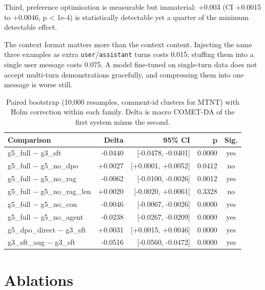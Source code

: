 \documentclass[a4paper,12pt,oneside]{article}
\begin{document}
Third, preference optimisation is measurable but immaterial: +0.003 (CI +0.0015 to +0.0046,
p < 1e-4) is statistically detectable yet a quarter of the minimum detectable effect.

The context format matters more than the context content. Injecting the same three examples as
extra \texttt{user}/\texttt{assistant} turns costs 0.015; stuffing them into a single user message costs 0.075.
A model fine-tuned on single-turn data does not accept multi-turn demonstrations gracefully, and
compressing them into one message is worse still.

\begin{table}[htbp]
\centering
\small

\begin{tabular}{lrrrc}
\toprule
\textbf{Comparison} & \textbf{Delta} & \textbf{95\% CI} & \textbf{p} & \textbf{Sig.} \\
\midrule
g5\_full $-$ g3\_sft & -0.0440 & [-0.0478, -0.0401] & 0.0000 & yes \\
g5\_full $-$ g5\_no\_dpo & +0.0027 & [+0.0001, +0.0052] & 0.0412 & no \\
g5\_full $-$ g5\_no\_rag & -0.0062 & [-0.0100, -0.0026] & 0.0012 & yes \\
g5\_full $-$ g5\_no\_rag\_len & +0.0020 & [-0.0020, +0.0061] & 0.3328 & no \\
g5\_full $-$ g5\_no\_con & -0.0046 & [-0.0067, -0.0026] & 0.0000 & yes \\
g5\_full $-$ g5\_no\_agent & -0.0238 & [-0.0267, -0.0209] & 0.0000 & yes \\
g5\_dpo\_direct $-$ g3\_sft & +0.0031 & [+0.0015, +0.0046] & 0.0000 & yes \\
g3\_sft\_aug $-$ g3\_sft & -0.0516 & [-0.0560, -0.0472] & 0.0000 & yes \\
\bottomrule
\end{tabular}
\caption{Paired bootstrap (10,000 resamples, comment-id clusters for MTNT) with Holm correction within each family. Delta is macro COMET-DA of the first system minus the second.}
\end{table}

\section{Ablations}
\end{document}
